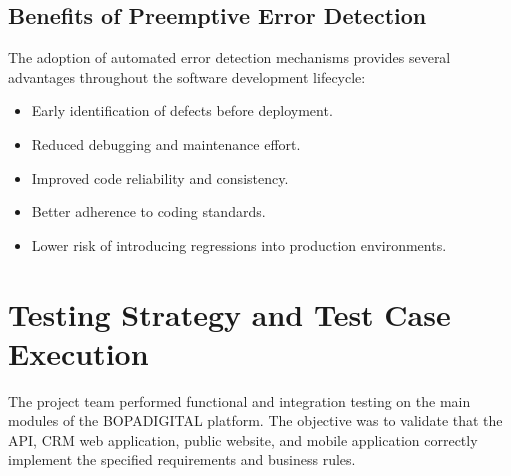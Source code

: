 \documentclass[letterpaper%
, oneside%
, 12pt%
, memoireprojet%
, english%
,creativecommons,hyperref, withAlgo2e %
]{thETS}
\begin{document}
\subsection{Benefits of Preemptive Error Detection}

The adoption of automated error detection mechanisms provides several advantages throughout the software development lifecycle:

\begin{itemize}
\item Early identification of defects before deployment.
\item Reduced debugging and maintenance effort.
\item Improved code reliability and consistency.
\item Better adherence to coding standards.
\item Lower risk of introducing regressions into production environments.
\end{itemize}



\section{Testing Strategy and Test Case Execution}

The project team performed functional and integration testing on the main modules of the BOPADIGITAL platform. The objective was to validate that the API, CRM web application, public website, and mobile application correctly implement the specified requirements and business rules.
\end{document}
